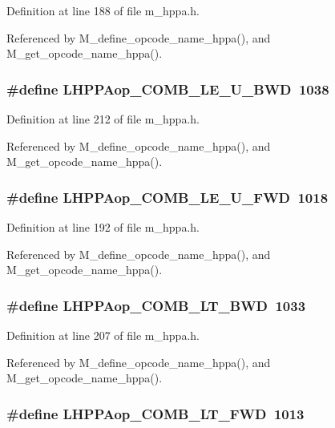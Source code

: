Definition at line 188 of file m\_\-hppa.h.

Referenced by M\_\-define\_\-opcode\_\-name\_\-hppa(), and M\_\-get\_\-opcode\_\-name\_\-hppa().
\subsubsection{\setlength{\rightskip}{0pt plus 5cm}\#define LHPPAop\_\-COMB\_\-LE\_\-U\_\-BWD~1038}\label{m__hppa_8h_32641702ba9d0ac80041b664869f21ea}




Definition at line 212 of file m\_\-hppa.h.

Referenced by M\_\-define\_\-opcode\_\-name\_\-hppa(), and M\_\-get\_\-opcode\_\-name\_\-hppa().
\subsubsection{\setlength{\rightskip}{0pt plus 5cm}\#define LHPPAop\_\-COMB\_\-LE\_\-U\_\-FWD~1018}\label{m__hppa_8h_351c652e0b06a5dc6ece92b5c19df125}




Definition at line 192 of file m\_\-hppa.h.

Referenced by M\_\-define\_\-opcode\_\-name\_\-hppa(), and M\_\-get\_\-opcode\_\-name\_\-hppa().
\subsubsection{\setlength{\rightskip}{0pt plus 5cm}\#define LHPPAop\_\-COMB\_\-LT\_\-BWD~1033}\label{m__hppa_8h_ced2f9ab38ae0abe47ff47629aa66a99}




Definition at line 207 of file m\_\-hppa.h.

Referenced by M\_\-define\_\-opcode\_\-name\_\-hppa(), and M\_\-get\_\-opcode\_\-name\_\-hppa().
\subsubsection{\setlength{\rightskip}{0pt plus 5cm}\#define LHPPAop\_\-COMB\_\-LT\_\-FWD~1013}\label{m__hppa_8h_eaf017373a2302eebb858798fde83796}




